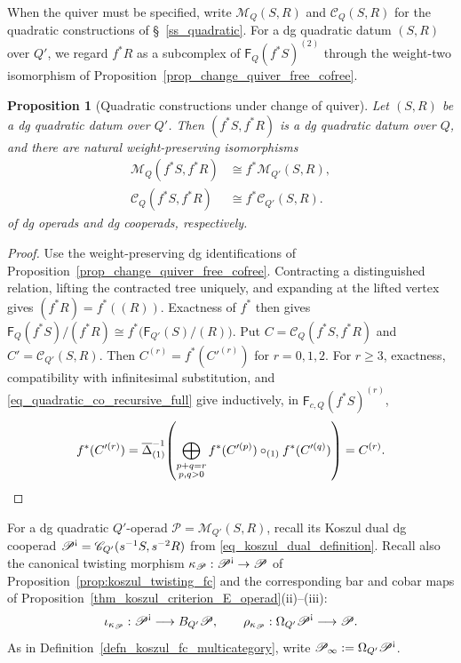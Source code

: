 \documentclass[11pt,letterpaper]{article}
\numberwithin{equation}{section}
\theoremstyle{plain}
\newtheorem{prop}[thm]{Proposition}
\theoremstyle{definition}
\theoremstyle{remark}
\newcommand{\antishriek}{%
	\mathord{\mathchoice
		{\rotatebox[origin=c]{180}{$\displaystyle !$}}
		{\rotatebox[origin=c]{180}{$\textstyle !$}}
		{\rotatebox[origin=c]{180}{$\scriptstyle !$}}
		{\rotatebox[origin=c]{180}{$\scriptscriptstyle !$}}}}
\newcommand{\p}{\mathfrak p}
\begin{document}
When the quiver must be specified, write $\mathscr M_Q(S,R)$ and
$\mathscr C_Q(S,R)$ for the quadratic constructions of
\S~\ref{ss_quadratic}. For a dg quadratic datum $(S,R)$ over $Q'$,
we regard $f^*R$ as a subcomplex of
$\mathsf F_Q(f^*S)^{(2)}$ through the weight-two isomorphism of
Proposition~\ref{prop_change_quiver_free_cofree}.

\begin{prop}[Quadratic constructions under change of quiver]
\label{prop_change_quiver_quadratic}
Let $(S,R)$ be a dg quadratic datum over $Q'$. Then
$(f^*S,f^*R)$ is a dg quadratic datum over $Q$, and there are
natural weight-preserving isomorphisms
\begin{equation}\label{eq_change_quiver_quadratic}
\begin{aligned}
 \mathscr M_Q(f^*S,f^*R)&\cong f^*\mathscr M_{Q'}(S,R),\\
 \mathscr C_Q(f^*S,f^*R)&\cong f^*\mathscr C_{Q'}(S,R).
\end{aligned}
\end{equation}
of dg operads and dg cooperads, respectively.
\end{prop}
\begin{proof}
Use the weight-preserving dg identifications of
Proposition~\ref{prop_change_quiver_free_cofree}.
Contracting a distinguished relation, lifting the contracted tree
uniquely, and expanding at the lifted vertex gives
$(f^*R)=f^*((R))$. Exactness of $f^*$ then gives
$\mathsf F_Q(f^*S)/(f^*R)
\cong f^*\bigl(\mathsf F_{Q'}(S)/(R)\bigr)$.
Put $C=\mathscr C_Q(f^*S,f^*R)$ and
$C'=\mathscr C_{Q'}(S,R)$. Then $C^{(r)}=f^*(C'^{(r)})$
for $r=0,1,2$. For $r\geq3$, exactness, compatibility with
infinitesimal substitution, and
\eqref{eq_quadratic_co_recursive_full} give inductively, in
$\mathsf F_{c,Q}(f^*S)^{(r)}$,
\[
 f^*(C'^{(r)})
 =\overline\Delta_{(1)}^{-1}\!\left(
   \bigoplus_{\substack{p+q=r\\p,q>0}}
   f^*(C'^{(p)})\circ_{(1)}f^*(C'^{(q)})\right)
 =C^{(r)}.
 \qedhere
\]
\end{proof}

For a dg quadratic $Q'$-operad $\mathscr P=\mathscr M_{Q'}(S,R)$,
recall its Koszul dual dg cooperad
$\mathscr P^{\antishriek}=\mathscr C_{Q'}(s^{-1}S,s^{-2}R)$
from \eqref{eq_koszul_dual_definition}.
Recall also the canonical
twisting morphism $\kappa_{\mathscr P}:\mathscr P^{\antishriek}\to\mathscr P$
of Proposition~\ref{prop:koszul_twisting_fc} and the corresponding
bar and cobar maps of
Proposition~\ref{thm_koszul_criterion_E_operad}(ii)--(iii):
\[
 \iota_{\kappa_{\mathscr P}}:
 \mathscr P^{\antishriek}\longrightarrow B_{Q'}\mathscr P,
 \qquad
 \rho_{\kappa_{\mathscr P}}:
 \Omega_{Q'}\mathscr P^{\antishriek}\longrightarrow\mathscr P.
\]
As in Definition~\ref{defn_koszul_fc_multicategory}, write
$\mathscr P_\infty:=\Omega_{Q'}\mathscr P^{\antishriek}$.
\end{document}
